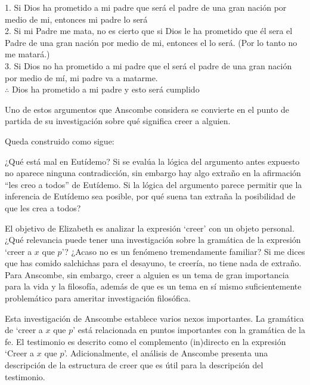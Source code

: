 \begin{adjustwidth}{1.2cm}{}
  1. Si Dios ha prometido a mi padre que será el padre de una gran nación por
  medio de mi, entonces mi padre lo será\\
  2. Si mi Padre me mata, no es cierto que si Dios le ha prometido que él sera
  el Padre de una gran nación por medio de mi, entonces el lo será.
  (Por lo tanto no me matará.)\\
  3. Si Dios no ha prometido a mi padre que el será el padre de una gran nación
  por medio de mí, mi padre va a matarme.\\
  $\therefore$ Dios ha prometido a mi padre y esto será cumplido\\
\end{adjustwidth}

Uno de estos argumentos que Anscombe considera se convierte en el
punto de partida de su investigación sobre qué significa creer a alguien.

Queda construido como
sigue: 

¿Qué está mal en Eutídemo? Si se evalúa la lógica del argumento antes expuesto
no aparece ninguna contradicción, sin embargo hay algo extraño en la afirmación
``les creo a todos'' de Eutídemo. Si la lógica del argumento parece permitir que
la inferencia de Eutídemo sea posible, por qué suena tan extraña la posibilidad
de que les crea a todos?

El objetivo de Elizabeth es analizar la expresión `creer' con un objeto
personal. ¿Qué relevancia puede tener una investigación sobre la gramática de la
expresión `creer a $x$ que $p$'? ¿Acaso no es un fenómeno tremendamente
familiar? Si me dices que has comido salchichas para el desayuno, te creería, no
tiene nada de extraño. Para Anscombe, sin embargo, creer a alguien es un tema de
gran importancia para la vida y la filosofía, además de que es un tema en sí
mismo suficientemente problemático para ameritar investigación filosófica.

Esta investigación de Anscombe establece varios nexos importantes. La gramática
de `creer a $x$ que $p$' está relacionada en puntos importantes con la gramática
de la fe. El testimonio es descrito como el complemento (in)directo en la
expresión `Creer a $x$ que $p$'. Adicionalmente, el análisis de Anscombe
presenta una descripción de la estructura de creer que es útil para la
descripción del testimonio.

